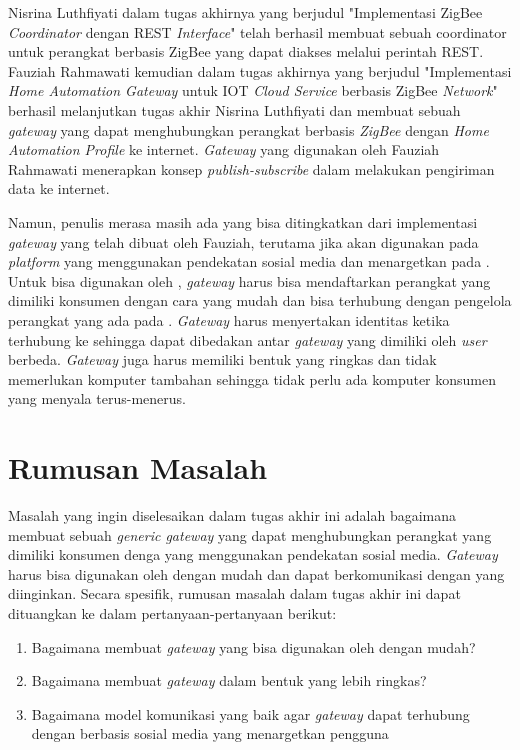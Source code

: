 Nisrina Luthfiyati dalam tugas akhirnya yang berjudul "Implementasi ZigBee \textit{Coordinator} dengan REST \textit{Interface}"\cite{2} telah berhasil membuat sebuah coordinator untuk perangkat berbasis ZigBee yang dapat diakses melalui perintah REST. Fauziah Rahmawati kemudian dalam tugas akhirnya yang berjudul "Implementasi \textit{Home Automation Gateway} untuk IOT \textit{Cloud Service} berbasis ZigBee \textit{Network}"\cite{3} berhasil melanjutkan tugas akhir Nisrina Luthfiyati dan membuat sebuah \textit{gateway} yang dapat menghubungkan perangkat berbasis \textit{ZigBee} dengan \textit{Home Automation Profile} ke internet. \textit{Gateway} yang digunakan oleh Fauziah Rahmawati menerapkan konsep \textit{publish-subscribe} dalam melakukan pengiriman data ke internet.

Namun, penulis merasa masih ada yang bisa ditingkatkan dari implementasi \textit{gateway} yang telah dibuat oleh Fauziah, terutama jika akan digunakan pada \textit{platform} \iot yang menggunakan pendekatan sosial media dan menargetkan pada \eu. Untuk bisa digunakan oleh \eu, \textit{gateway} harus bisa mendaftarkan perangkat yang dimiliki konsumen dengan cara yang mudah dan bisa terhubung dengan pengelola perangkat yang ada pada \plat. \textit{Gateway} harus menyertakan identitas ketika terhubung ke \plat sehingga dapat dibedakan antar \textit{gateway} yang dimiliki oleh \textit{user} berbeda. \textit{Gateway} juga harus memiliki bentuk yang ringkas dan tidak memerlukan komputer tambahan sehingga tidak perlu ada komputer konsumen yang menyala terus-menerus.


\section{Rumusan Masalah}
Masalah yang ingin diselesaikan dalam tugas akhir ini adalah bagaimana membuat sebuah \textit{generic gateway} yang dapat menghubungkan perangkat yang dimiliki konsumen denga \plat \iot yang menggunakan pendekatan sosial media. \textit{Gateway} harus bisa digunakan oleh \eu dengan mudah dan dapat berkomunikasi dengan \plat yang diinginkan. Secara spesifik, rumusan masalah dalam tugas akhir ini dapat dituangkan ke dalam pertanyaan-pertanyaan berikut:
\begin{enumerate}
	\item Bagaimana membuat \textit{gateway} yang bisa digunakan oleh \eu dengan mudah?
	\item Bagaimana membuat \textit{gateway} dalam bentuk yang lebih ringkas?
	\item Bagaimana model komunikasi yang baik agar \textit{gateway} dapat terhubung dengan \plat berbasis sosial media yang menargetkan pengguna \eu
\end{enumerate}


